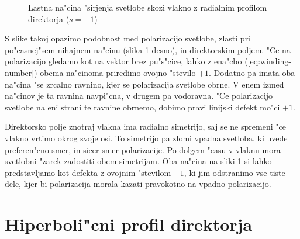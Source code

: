\documentclass[12pt,twoside,openright,final]{report}
\begin{document}
\begin{figure}[!htbp]
 \centering
 \caption{Lastna na"cina "sirjenja svetlobe skozi vlakno z radialnim profilom direktorja ($s=+1$)}
 \label{fig:pulse-p1-mode}
\end{figure}

S slike takoj opazimo podobnost med polarizacijo svetlobe, zlasti pri po"casnej"sem nihajnem na"cinu (slika \ref{fig:pulse-p1-mode} desno), in direktorskim poljem. 
"Ce na polarizacijo gledamo kot na vektor brez pu"s"cice, lahko z ena"cbo (\ref{eq:winding-number}) obema na"cinoma priredimo ovojno "stevilo $+1$. 
Dodatno pa imata oba na"cina "se zrcalno ravnino, kjer se polarizacija svetlobe obrne. 
V enem izmed na"cinov je ta ravnina navpi"cna, v drugem pa vodoravna. 
"Ce polarizacijo svetlobe na eni strani te ravnine obrnemo, dobimo pravi linijski defekt mo"ci $+1$. 

Direktorsko polje znotraj vlakna ima radialno simetrijo, saj se ne spremeni "ce vlakno vrtimo okrog svoje osi. 
To simetrijo pa zlomi vpadna svetloba, ki uvede preferen"cno smer, in sicer smer polarizacije. 
Po dolgem "casu v vlaknu mora svetlobni "zarek zadostiti obem simetrijam. 
Oba na"cina na sliki \ref{fig:pulse-p1-mode} si lahko predstavljamo kot defekta z ovojnim "stevilom $+1$, ki jim odstranimo vse tiste dele, kjer bi polarizacija morala kazati pravokotno na vpadno polarizacijo. 

\section{Hiperboli"cni profil direktorja}
\end{document}
